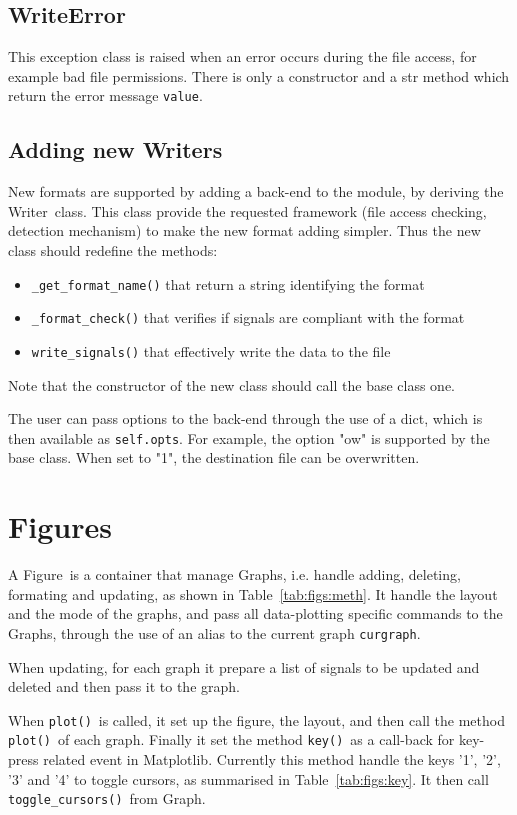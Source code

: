 \documentclass[a4paper,11pt]{article}
\newcommand{\att}[1]{\texttt{#1}}
\newcommand{\meth}[1]{\texttt{#1()}}
\newcommand{\cls}[1]{\textsf{#1}}
\newcommand{\wrt}{\cls{Writer}}
\newcommand{\graph}{\cls{Graph}}
\newcommand{\fig}{\cls{Figure}}
\begin{document}
\subsection{WriteError}
This exception class is raised when an error occurs during the file access, for example bad file permissions.
There is only a constructor and a str method which return the error message \att{value}.

\subsection{Adding new Writers}
New formats are supported by adding a back-end to the module, by deriving the \wrt\ class.
This class provide the requested framework (file access checking, detection mechanism) to make the new format adding simpler.
Thus the new class should redefine the methods:
\begin{itemize}
\item \meth{\_get\_format\_name} that return a string identifying the format
\item \meth{\_format\_check} that verifies if signals are compliant with the format
\item \meth{write\_signals} that effectively write the data to the file
\end{itemize}
Note that the constructor of the new class should call the base class one.

The user can pass options to the back-end through the use of a dict, which is then available as \att{self.opts}.
For example, the option "ow" is supported by the base class.
When set to "1", the destination file can be overwritten.

\section{Figures}
\label{sec:figs}
A \fig\ is a container that manage \graph s, i.e. handle adding, deleting, formating and updating, as shown in Table~\ref{tab:figs:meth}.
It handle the layout and the mode of the graphs, and pass all data-plotting specific commands to the \graph s, through the use of an alias to the current graph \att{curgraph}.

When updating, for each graph it prepare a list of signals to be updated and deleted and then pass it to the graph.

When \meth{plot}\ is called, it set up the figure, the layout, and then call the method \meth{plot}\ of each graph.
Finally it set the method \meth{key}\ as a call-back for key-press related event in Matplotlib.
Currently this method handle the keys '1', '2', '3' and '4' to toggle cursors, as summarised in Table~\ref{tab:figs:key}.
It then call \meth{toggle\_cursors}\ from \graph.
\end{document}
